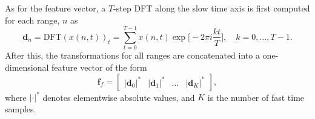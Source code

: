 



As for the feature vector, a $T$-step DFT along the slow time axis is first computed for each range, $n$ as
\begin{equation}
	\mathbf{d}_n=\text{DFT}(x(n,t))_t =  \sum_{t=0}^{T-1}x(n,t)\exp\Big[-2\pi i\frac{kt}{T}\Big], \quad k=0,...,T-1.
\end{equation}
After this, the transformations for all ranges are concatenated into a one-dimensional feature vector of the form
\begin{equation}
	\textbf{f}_{f}=\begin{bmatrix} |\mathbf{d}_0|^* & |\mathbf{d}_1|^* & \hdots & |\mathbf{d}_K|^* \end{bmatrix},
\end{equation}
where $|\cdot|^*$ denotes elementwise absolute values, and $K$ is the number of fast time samples.



